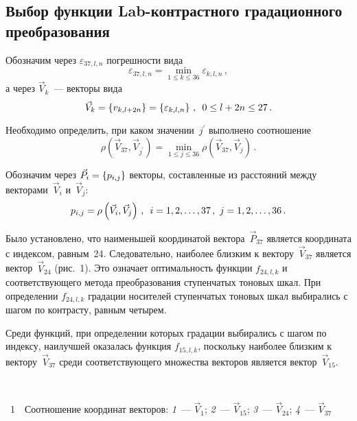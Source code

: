 \begin{multicols}{2}
\section{Выбор функции Lab-контрастного градационного 
преобразования}

  Обозначим через $\varepsilon_{37,l,n}$ погрешности вида
  $$
  \varepsilon_{37,l,n} =\min\limits_{1\leq k\leq 36} \varepsilon_{k,l,n}\,,
  $$
а через $\vec{V}_k$~--- векторы вида
$$
\vec{V}_k=\left\{ v_{k,l+2n}\right\} =\left\{\varepsilon_{k,l,n}\right\}\,,\enskip 
0\leq l+2n\leq 27\,.
$$


  
  Необходимо определить, при каком значении~$j^\prime$ выполнено 
соотношение 
  $$
  \rho\left( \vec{V}_{37},\vec{V}_{j^\prime}\right) =\min\limits_{1\leq j\leq 36} 
\rho \left( \vec{V}_{37},\vec{V}_j\right)\,.
  $$
  
  Обозначим через $\vec{P}_i\hm=\left\{ p_{i,j}\right\}$ векторы, со\-став\-лен\-ные 
из расстояний между векторами~$\vec{V}_i$ и~$\vec{V}_j$: 
  $$
  p_{i,j} =\rho \left( \vec{V}_i,\vec{V}_j\right)\,,\enskip i=1,2,\ldots , 37\,,\ 
j=1,2,\ldots , 36\,.
  $$
  
  Было установлено, что наименьшей координатой вектора~$\vec{P}_{37}$ 
является координата с индексом, равным~24. Следовательно, 
наиболее близким к вектору~$\vec{V}_{37}$  является вектор~$\vec{V}_{24}$ 
(рис.~1). Это означает оптимальность функции $f_{24,l,k}$ и соответствующего 
метода преобразования ступенчатых тоновых шкал. При определении $f_{24,l,k}$ 
градации носителей ступенчатых тоновых шкал выбирались с шагом по 
контрасту, равным четырем. 
  
  Среди функций, при определении которых градации выбирались с шагом по 
индексу, наилучшей оказалась функция $f_{15,l,k}$, поскольку наиболее близким 
к вектору~$\vec{V}_{37}$ среди соответствующего множества векторов 
является вектор~$\vec{V}_{15}$. 

\begin{center}  %
\vspace*{-3pt}
\mbox{%
 \epsfxsize=72.254mm
 }
  \end{center}
  
    \vspace*{-3pt}

\noindent
{{\figurename~1}\ \ \small{Соотношение координат векторов: \textit{1}~--- $\vec{V}_1$; \textit{2}~--- 
$\vec{V}_{15}$; \textit{3}~--- $\vec{V}_{24}$; \textit{4}~--- $\vec{V}_{37}$}}



\end{multicols}
